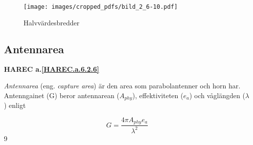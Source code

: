 \begin{figure}
  \texttt{[image: images/cropped\_pdfs/bild\_2\_6-10.pdf]}
  \caption{Halvvärdesbredder}
  \label{fig:bildII6-10}
\end{figure}

\subsection{Antennarea}
\textbf{
HAREC a.\ref{HAREC.a.6.2.6}\label{myHAREC.a.6.2.6}
}

\emph{Antennarea} (eng. \emph{capture area}) är den area som parabolantenner
och horn har.
Antenngainet (G) beror antennarean (\(A_{phy}\)), effektiviteten (\(e_a\)) och
våglängden (\(\lambda\)) enligt

\[ G = \frac{4\pi A_{phy}e_a}{\lambda^2} \]
9
